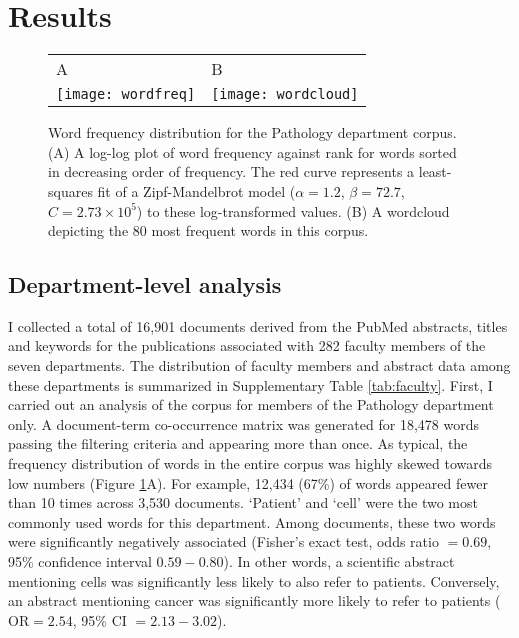 \documentclass[12pt]{article}
\begin{document}
\clearpage

\section * {Results}


\begin{figure}[tbp]
\centering
\begin{tabular}{ll}
{\large A} & {\large B}\\[-24pt]
\texttt{[image: wordfreq]} & 
\texttt{[image: wordcloud]}\\
\end{tabular}
\caption{
Word frequency distribution for the Pathology department corpus.
(A) A log-log plot of word frequency against rank for words sorted in decreasing order of frequency.
The red curve represents a least-squares fit of a Zipf-Mandelbrot model ($\alpha=1.2$, $\beta=72.7$, $C=2.73\times 10^{5}$) to these log-transformed values.
(B) A wordcloud depicting the 80 most frequent words in this corpus.
}
\label{fig:worddist}
\end{figure}


\subsection * {Department-level analysis}

I collected a total of 16,901 documents derived from the PubMed abstracts, titles and keywords for the publications associated with 282 faculty members of the seven departments.
The distribution of faculty members and abstract data among these departments is summarized in Supplementary Table \ref{tab:faculty}.
First, I carried out an analysis of the corpus for members of the Pathology department only.
A document-term co-occurrence matrix was generated for 18,478 words passing the filtering criteria and appearing more than once.
As typical, the frequency distribution of words in the entire corpus was highly skewed towards low numbers (Figure \ref{fig:worddist}A).
For example, 12,434 (67\%) of words appeared fewer than 10 times across 3,530 documents.
`Patient' and `cell' were the two most commonly used words for this department.
Among documents, these two words were significantly negatively associated (Fisher's exact test, odds ratio $= 0.69$, 95\% confidence interval $0.59 - 0.80$).
In other words, a scientific abstract mentioning cells was significantly less likely to also refer to patients.
Conversely, an abstract mentioning cancer was significantly more likely to refer to patients ($\text{OR}=2.54$, 95\% CI $=2.13-3.02$).
\end{document}
